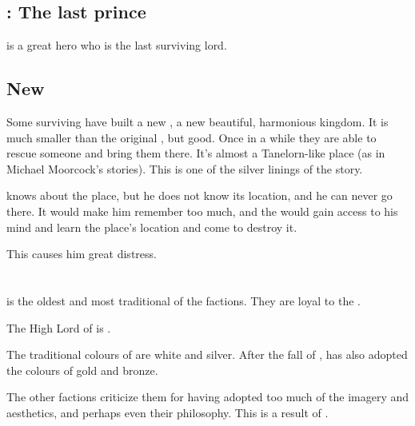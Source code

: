 \subsection{\Sithiyacaan: The last \Kezeradi{} prince}
\hs{\Sithiyacaan} is a great hero who is the last surviving \Kezeradi{} lord. 







\subsection{New \Kezerad}
Some surviving \Kezeradi{} have built a new \Kezerad, a new beautiful, harmonious kingdom. It is much smaller than the original \Kezerad, but good. Once in a while they are able to rescue someone and bring them there. It's almost a Tanelorn-like place (as in Michael Moorcock's stories). This is one of the silver linings of the story. 

\hs{\Sithiyacaan} knows about the place, but he does not know its location, and he can never go there. It would make him remember too much, and the \Sephiroth{} would gain access to his mind and learn the place's location and come to destroy it. 

This causes him great distress. 















\section{\KiriathSepher}
\label{\KiriathSepher}
\KiriathSepher{} is the oldest and most traditional of the \resphan{} factions. 
They are loyal to the \banes. 

\label{High Lord of Kiriath-Sepher}
The High Lord of \KiriathSepher{} is \hyperref[Azraid]\Azraid. 

The traditional colours of \KiriathSepher{} are white and silver. 
After the fall of \Kezerad, \KiriathSepher{} has also adopted the colours of gold and bronze. 

The other factions criticize them for having adopted too much of the \Merkyran{} imagery and aesthetics, and perhaps even their philosophy. This is a result of .

